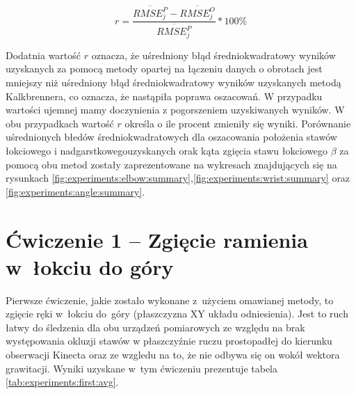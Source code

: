 \begin{equation}
	r = \frac{\overline{RMSE^P_j} - \overline{RMSE^O_j}}{\overline{RMSE^P_j}} * 100\%
	\label{eq:experiments:comparison}
\end{equation}
						
Dodatnia wartość $r$ oznacza, że uśredniony błąd średniokwadratowy wyników uzyskanych za pomocą metody opartej na łączeniu danych o obrotach jest mniejszy niż uśredniony błąd średniokwadratowy wyników uzyskanych metodą Kalkbrennera, co oznacza, że nastąpiła poprawa oszacowań. W przypadku wartości ujemnej mamy doczynienia z pogorszeniem uzyskiwanych wyników. W obu przypadkach wartość $r$ określa o ile procent zmieniły się wyniki. Porównanie uśrednionych błedów średniokwadratowych dla oszacowania położenia stawów łokciowego i nadgarstkowegouzyskanych orak kąta zgięcia stawu łokciowego $\beta$ za pomocą obu metod zostały zaprezentowane na wykresach znajdujących się na rysunkach \ref{fig:experiments:elbow:summary},\ref{fig:experiments:wrist:summary} oraz \ref{fig:experiments:angle:summary}.
						
\section*{Ćwiczenie 1 -- Zgięcie ramienia w~łokciu do góry}
Pierwsze ćwiczenie, jakie zostało wykonane z~użyciem omawianej metody, to zgięcie ręki w~łokciu do~góry (płaszczyzna XY układu odniesienia). Jest to ruch łatwy do śledzenia dla obu urządzeń pomiarowych ze względu na brak występowania okluzji stawów w płaszczyźnie ruczu prostopadłej do kierunku obserwacji Kinecta oraz ze wzgledu na to, że nie odbywa się on wokół wektora grawitacji. Wyniki uzyskane w~tym ćwiczeniu prezentuje tabela \ref{tab:experiments:first:avg}.
						
